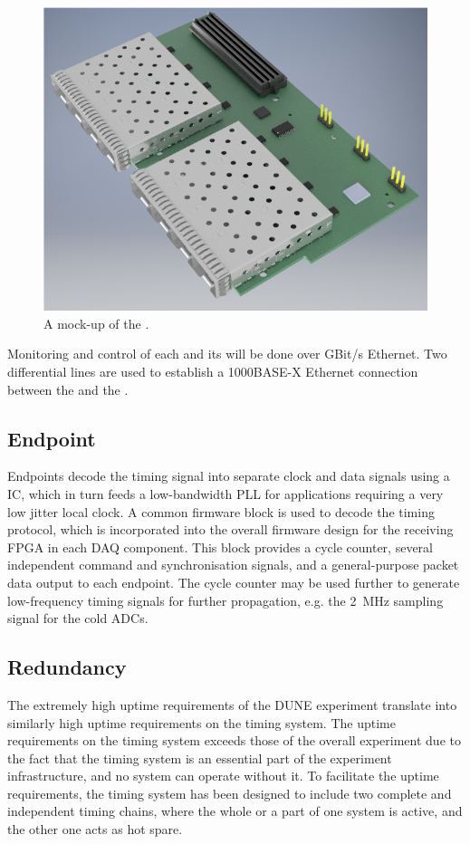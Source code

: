 \documentclass{dune}
\begin{document}
\begin{figure}[h]
\includegraphics[width=\textwidth]{fib_mockup.png}
\caption{A mock-up of the .}
\label{fig:fib_mockup}
\end{figure}

Monitoring and control of each  and its  will be done over GBit/s Ethernet. Two differential lines are used to establish a 1000BASE-X Ethernet connection between the  and the .

\subsection{Endpoint}
Endpoints decode the timing signal into separate clock and data
signals using a  IC, which in turn feeds a low-bandwidth PLL for applications requiring a very low jitter local clock. A common firmware block is used to decode the timing protocol, which is incorporated into the overall firmware design for the receiving FPGA in each DAQ component. This block provides a cycle counter, several independent command and synchronisation signals, and a general-purpose packet data output to each endpoint. The cycle counter may be used further to generate low-frequency timing signals for further propagation, e.g. the \SI{2}{\MHz} sampling signal for the cold ADCs.
\subsection{Redundancy}
The extremely high uptime requirements of the DUNE experiment translate into similarly high uptime requirements on the timing system. The uptime requirements on the timing system exceeds those of the overall experiment due to the fact that the timing system is an essential part of the experiment infrastructure, and no system can operate without it. To facilitate the uptime requirements, the timing system has been designed to include two complete and independent timing chains, where the whole or a part of one system is active, and the other one acts as hot spare.
\end{document}
